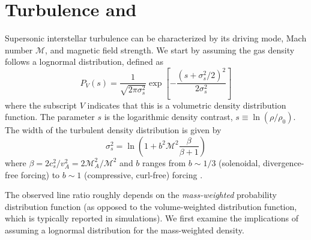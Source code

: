 \section{Turbulence and \formaldehyde}
Supersonic interstellar turbulence can be characterized by its driving mode,
Mach number $\mathcal{M}$, and magnetic field strength. 
We start by assuming the gas density follows a lognormal distribution, defined
as 
\begin{equation}
    \label{eqn:lognormal}
    P_V(s) = \frac{1}{\sqrt{2 \pi \sigma_s^2}} \exp\left[-\frac{(s+\sigma_s^2/2)^2}{2 \sigma_s^2}\right]
\end{equation}
\citep{Padoan2011b,Molina2012a}
where the subscript $V$ indicates that this is a volumetric density
distribution function.  The parameter $s$ is the logarithmic
density contrast, $s\equiv\ln(\rho/\rho_0)$.
The width of the turbulent density distribution
is given by
\begin{equation}
    \label{eqn:sigmas}
    \sigma_s^2 = \ln\left(1+b^2 \mathcal{M}^2 \frac{\beta}{\beta+1}\right)
\end{equation}
where $\beta= 2 c_s^2/v_A^2 = 2 \mathcal{M}_A^2/\mathcal{M}^2$ and $b$ ranges
from $b\sim1/3$ (solenoidal, divergence-free forcing) to $b\sim1$ (compressive, curl-free)
forcing \citep{Federrath2010a}.  


The observed \formaldehyde line ratio roughly depends on the \emph{mass-weighted}
probability distribution function (as opposed to the volume-weighted
distribution function, which is typically reported in simulations).  We first
examine the implications of assuming a lognormal distribution for the
mass-weighted density.

